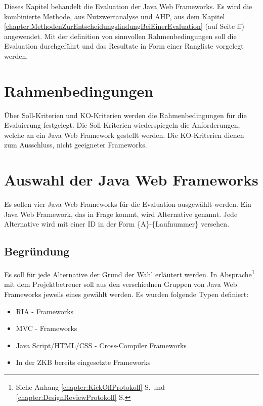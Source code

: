   Dieses Kapitel behandelt die Evaluation der Java Web Frameworks. Es wird die
  kombinierte Methode, aus Nutzwertanalyse und \ac{AHP}, aus dem Kapitel 
  \ref{chapter:MethodenZurEntscheidungsfindungBeiEinerEvaluation}
   (auf
  Seite \pageref{chapter:MethodenZurEntscheidungsfindungBeiEinerEvaluation}ff)
  angewendet. Mit der definition von sinnvollen Rahmenbedingungen soll die
  Evaluation durchgeführt und das Resultate in Form einer Rangliste vorgelegt
  werden.
    
  \section{Rahmenbedingungen}
  
  Über Soll-Kriterien und KO-Kriterien werden die Rahmenbedingungen für die
  Evaluierung festgelegt. Die Soll-Kriterien wiederspiegeln die Anforderungen,
  welche an ein Java Web Framework gestellt werden. Die KO-Kriterien dienen zum
  Ausschluss, nicht geeigneter Frameworks.

  \section{Auswahl der Java Web Frameworks}
  
  Es sollen vier Java Web Frameworks für die Evaluation ausgewählt werden. Ein
  Java Web Framework, das in Frage kommt, wird Alternative genannt. Jede
  Alternative wird mit einer ID in der Form \{A\}-\{Laufnummer\} versehen.
  
  \subsection{Begründung}
  
  Es soll für jede Alternative der Grund der Wahl erläutert werden. In
  Absprache\footnote{Siehe Anhang \ref{chapter:KickOffProtokoll}
   S. \pageref{chapter:KickOffProtokoll} und
  \ref{chapter:DesignReviewProtokoll} 
  S. \pageref{chapter:DesignReviewProtokoll}} mit dem Projektbetreuer soll aus
  den verschiednen Gruppen von Java Web Frameworks jeweils eines gewählt werden.
  Es wurden folgende Typen definiert:
  
  \begin{itemize}
    \item \ac{RIA} - Frameworks
    \item MVC - Frameworks
    \item Java Script/HTML/CSS - Cross-Compiler Frameworks
    \item In der \ac{ZKB} bereits eingesetzte Frameworks
  \end{itemize}
  
